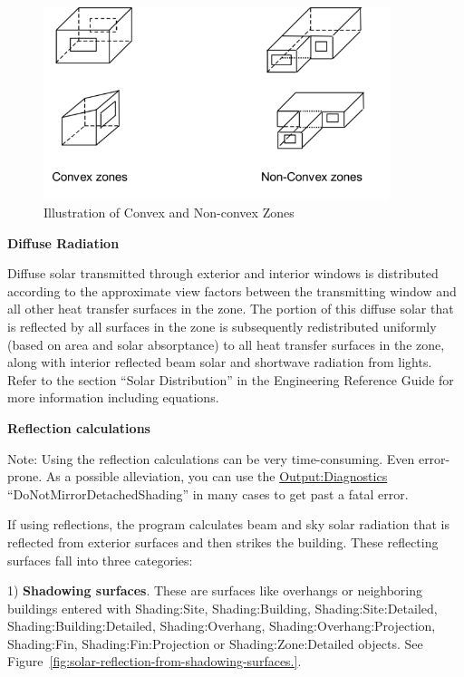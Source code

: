 \begin{figure}[hbtp] %
\centering
\includegraphics[width=0.9\textwidth, height=0.9\textheight, keepaspectratio=true]{media/image002.png}
\caption{Illustration of Convex and Non-convex Zones \protect \label{fig:illustration-of-convex-and-non-convex-zones}}
\end{figure}

\textbf{Diffuse Radiation}

Diffuse solar transmitted through exterior and interior windows is distributed according to the approximate view factors between the transmitting window and all other heat transfer surfaces in the zone.
The portion of this diffuse solar that is reflected by all surfaces in the zone is subsequently redistributed uniformly (based on area and solar absorptance) to all heat transfer surfaces in the zone, along with interior reflected beam solar and shortwave radiation from lights. Refer to the section ``Solar Distribution'' in the Engineering Reference Guide for more information including equations.

\textbf{Reflection calculations}

Note: Using the reflection calculations can be very time-consuming. Even error-prone. As a possible alleviation, you can use the \hyperref[outputdiagnostics]{Output:Diagnostics} ``DoNotMirrorDetachedShading'' in many cases to get past a fatal error.

If using reflections, the program calculates beam and sky solar radiation that is reflected from exterior surfaces and then strikes the building. These reflecting surfaces fall into three categories:

1) \textbf{Shadowing surfaces}. These are surfaces like overhangs or neighboring buildings entered with Shad\-ing:\-Site, Shad\-ing:\-Build\-ing, Shad\-ing:\-Site:\-Detailed, Shad\-ing:\-Build\-ing:\-Detailed, Shad\-ing:\-Over\-hang, Shad\-ing:\-Over\-hang:Pro\-jection, Shad\-ing:\-Fin, Shad\-ing:\-Fin:\-Pro\-jection or Shad\-ing:\-Zone:\-Detailed objects. See Figure~\ref{fig:solar-reflection-from-shadowing-surfaces.}.

